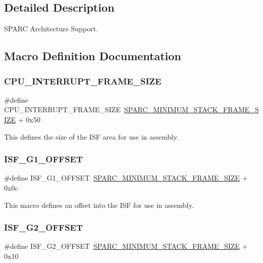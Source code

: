 \subsection{Detailed Description}
S\+P\+A\+RC Architecture Support. 



\subsection{Macro Definition Documentation}
\mbox{\label{group__RTEMSScoreCPUSPARC_gac17ddadf3ff0907a3beefb6d72b1563f}} 
\subsubsection{\texorpdfstring{CPU\_INTERRUPT\_FRAME\_SIZE}{CPU\_INTERRUPT\_FRAME\_SIZE}}
{\footnotesize\ttfamily \#define C\+P\+U\+\_\+\+I\+N\+T\+E\+R\+R\+U\+P\+T\+\_\+\+F\+R\+A\+M\+E\+\_\+\+S\+I\+ZE~\mbox{\hyperlink{group__RTEMSScoreCPUSPARC_ga8e296685f05588131b26bdc695cb9b8c}{S\+P\+A\+R\+C\+\_\+\+M\+I\+N\+I\+M\+U\+M\+\_\+\+S\+T\+A\+C\+K\+\_\+\+F\+R\+A\+M\+E\+\_\+\+S\+I\+ZE}} + 0x50}

This defines the size of the I\+SF area for use in assembly. \mbox{\label{group__RTEMSScoreCPUSPARC_ga9c08c95ba5cb00d95e8e20edbae0d28a}} 
\subsubsection{\texorpdfstring{ISF\_G1\_OFFSET}{ISF\_G1\_OFFSET}}
{\footnotesize\ttfamily \#define I\+S\+F\+\_\+\+G1\+\_\+\+O\+F\+F\+S\+ET~\mbox{\hyperlink{group__RTEMSScoreCPUSPARC_ga8e296685f05588131b26bdc695cb9b8c}{S\+P\+A\+R\+C\+\_\+\+M\+I\+N\+I\+M\+U\+M\+\_\+\+S\+T\+A\+C\+K\+\_\+\+F\+R\+A\+M\+E\+\_\+\+S\+I\+ZE}} + 0x0c}

This macro defines an offset into the I\+SF for use in assembly. \mbox{\label{group__RTEMSScoreCPUSPARC_gaa242fa752cee276259ccf1950425b2f2}} 
\subsubsection{\texorpdfstring{ISF\_G2\_OFFSET}{ISF\_G2\_OFFSET}}
{\footnotesize\ttfamily \#define I\+S\+F\+\_\+\+G2\+\_\+\+O\+F\+F\+S\+ET~\mbox{\hyperlink{group__RTEMSScoreCPUSPARC_ga8e296685f05588131b26bdc695cb9b8c}{S\+P\+A\+R\+C\+\_\+\+M\+I\+N\+I\+M\+U\+M\+\_\+\+S\+T\+A\+C\+K\+\_\+\+F\+R\+A\+M\+E\+\_\+\+S\+I\+ZE}} + 0x10}

